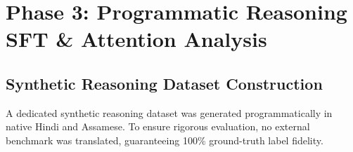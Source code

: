 \documentclass[11pt,a4paper]{article}
\begin{document}
\section{Phase 3: Programmatic Reasoning SFT \& Attention Analysis}

\subsection{Synthetic Reasoning Dataset Construction}
A dedicated synthetic reasoning dataset was generated programmatically in native Hindi and Assamese. To ensure rigorous evaluation, no external benchmark was translated, guaranteeing 100\% ground-truth label fidelity.
\end{document}
